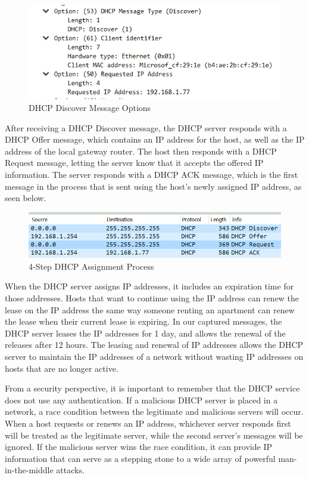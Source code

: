 \documentclass[10pt]{IEEEtran}
\begin{document}
\begin{figure}[h!]

	\includegraphics[width=\linewidth]{DHCPDiscovery.png}
	\caption{DHCP Discover Message Options}
	\label{fig:dhcpCap1}
\end{figure}
 
 After receiving a DHCP Discover message, the DHCP server responds with a DHCP Offer message, which contains an IP address for the host, as well as the IP address of the local gateway router. The host then responds with a DHCP Request message, letting the server know that it accepts the offered IP information. The server responds with a DHCP ACK message, which is the first message in the process that is sent using the host's newly assigned IP address, as seen below. \\
 
 \begin{figure}[h!]

	\includegraphics[width=\linewidth]{dhcpprocess.png}
	\caption{4-Step DHCP Assignment Process}
	\label{fig:dhcpCap2}
\end{figure}

 When the DHCP server assigns IP addresses, it includes an expiration time for those addresses. Hosts that want to continue using the IP address can renew the lease on the IP address the same way someone renting an apartment can renew the lease when their current lease is expiring. In our captured messages, the DHCP server leases the IP addresses for 1 day, and allows the renewal of the releases after 12 hours. The leasing and renewal of IP addresses allows the DHCP server to maintain the IP addresses of a network without wasting IP addresses on hosts that are no longer active.
 
 From a security perspective, it is important to remember that the DHCP service does not use any authentication. If a malicious DHCP server is placed in a network, a race condition between the legitimate and malicious servers will occur. When a host requests or renews an IP address, whichever server responds first will be treated as the legitimate server, while the second server's messages will be ignored. If the malicious server wins the race condition, it can provide IP information that can serve as a stepping stone to a wide array of powerful man-in-the-middle attacks.
 
\end{document}
